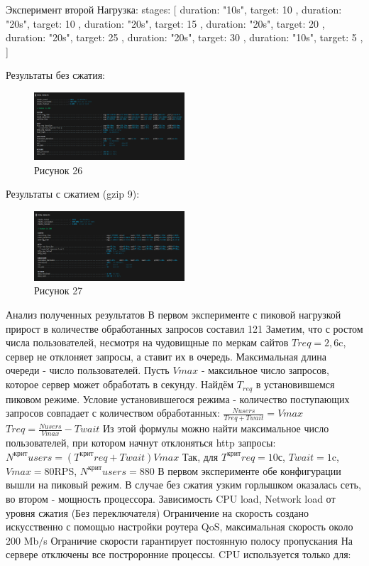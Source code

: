 \documentclass[12pt]{article}
\begin{document}
Эксперимент второй
Нагрузка:
  stages: [
    { duration: "10s", target: 10 },
    { duration: "20s", target: 10 },
    { duration: "20s", target: 15 },
    { duration: "20s", target: 20 },
    { duration: "20s", target: 25 },
    { duration: "20s", target: 30 },
    { duration: "10s", target: 5 },
  ]

Результаты без сжатия:
\begin{figure}[h!]
\centering
\includegraphics[width=0.5\textwidth]{../images/no-compress_exp2_k6screen.png}
\caption{Рисунок 26}
\end{figure}

Результаты с сжатием (gzip 9):
\begin{figure}[h!]
\centering
\includegraphics[width=0.5\textwidth]{../images/gzip9_exp2_k6screen.png}
\caption{Рисунок 27}
\end{figure}

Анализ полученных результатов
В первом эксперименте с пиковой нагрузкой прирост в количестве обработанных запросов составил 121%
Заметим, что с ростом числа пользователей, несмотря на чудовищные по меркам сайтов $T{req}=2,6$c, сервер не отклоняет запросы, а ставит их в очередь. Максимальная длина очереди - число пользователей. Пусть $V{max}$ - максильное число запросов, которое сервер может обработать в секунду. Найдём $T_{req}$ в установившемся пиковом режиме. Условие установившегося режима - количество поступающих запросов совпадает с количеством обработанных: 
$\frac{N{users}}{T{req} + T{wait}}=V{max}$
$T{req} = \frac{N{users}}{V{max}} - T{wait}$
Из этой формулы можно найти максимальное число пользователей, при котором начнут отклоняться http запросы: 
$N^{крит}{users} = (T^{крит}{req} + T{wait}){V{max}}$
Так, для $T^{крит}{req} = 10$с, $T{wait}=1$c, $V{max}=80$RPS, $N^{крит}{users}=880$
В первом эксперименте обе конфигурации вышли на пиковый режим. В случае без сжатия узким горлышком оказалась сеть, во втором - мощность процессора. 
Зависимость CPU load, Network load от уровня сжатия (Без переключателя)
Ограничение на скорость создано искусственно с помощью настройки роутера QoS, максимальная скорость около 200 Mb/s
Ограничие скорости гарантирует постоянную полосу пропускания
На сервере отключены все построронние процессы. CPU используется только для:
\end{document}
